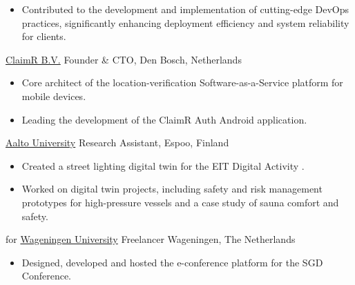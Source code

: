 {{\begin{itemize}[leftmargin=0.6cm, label={\textbullet}]
\begin{itemize}
    \item
        :  
    
     		      \end{itemize}
     		       		      		                      
     		\item Contributed to the development and implementation of cutting-edge DevOps practices, significantly enhancing deployment efficiency and system reliability for clients.
     	\end{itemize}
     }
    
     
     {{\color{blue}\href{https://claimr.tools}{ClaimR B.V.}}}
     {Founder \& CTO,}
     {Den Bosch, Netherlands}
     {}{}
     {
     	\begin{itemize}[leftmargin=0.6cm, label={\textbullet}]
     		\item Core architect of the {} location-verification Software-as-a-Service platform for mobile devices. 
     		\item Leading the development of the ClaimR Auth Android application.
     	\end{itemize}
     }
      
     {{\color{blue}\href{https://www.aalto.fi/en}{Aalto University}}}
     {Research Assistant,}
     {Espoo, Finland}
     {}{}
     {
     	\begin{itemize}[leftmargin=0.6cm, label={\textbullet}]
     		\item Created a street lighting digital twin for the EIT Digital Activity .
     		\item Worked on digital twin projects, including safety and risk management prototypes for high-pressure vessels and a case study of sauna comfort and safety.
     	\end{itemize}
     }
      
     {for {\color{blue}\href{https://wur.nl/en}{Wageningen University}}}
     {Freelancer}
     {Wageningen, The Netherlands}
     {}{}
     {
     	\begin{itemize}[leftmargin=0.6cm, label={\textbullet}]
     		\item Designed, developed and hosted the e-conference platform  for the SGD Conference.
     	\end{itemize}
     }
      
}
